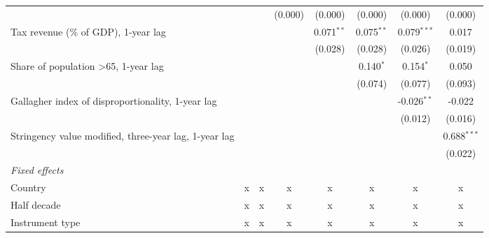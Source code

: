 \begin{tabular}{lccccccc}
                                                                       &         &              & (0.000)        & (0.000)        & (0.000)        & (0.000)        & (0.000)\\   
   Tax revenue (\% of GDP), 1-year lag                                 &         &              &                & 0.071$^{**}$   & 0.075$^{**}$   & 0.079$^{***}$  & 0.017\\   
                                                                       &         &              &                & (0.028)        & (0.028)        & (0.026)        & (0.019)\\   
   Share of population >65, 1-year lag                                 &         &              &                &                & 0.140$^{*}$    & 0.154$^{*}$    & 0.050\\   
                                                                       &         &              &                &                & (0.074)        & (0.077)        & (0.093)\\   
   Gallagher index of disproportionality, 1-year lag                   &         &              &                &                &                & -0.026$^{**}$  & -0.022\\   
                                                                       &         &              &                &                &                & (0.012)        & (0.016)\\   
   Stringency value modified, three-year lag, 1-year lag               &         &              &                &                &                &                & 0.688$^{***}$\\   
                                                                       &         &              &                &                &                &                & (0.022)\\   
   \emph{Fixed effects}\\
   Country                                                             & x       & x            & x              & x              & x              & x              & x\\  
   Half decade                                                         & x       & x            & x              & x              & x              & x              & x\\  
   Instrument type                                                     & x       & x            & x              & x              & x              & x              & x\\  

\end{tabular}

